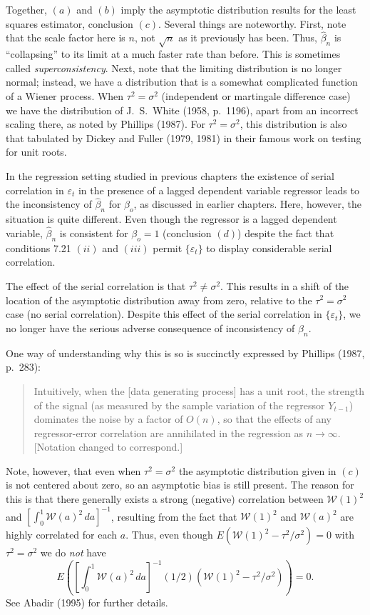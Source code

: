 Together, $(a)$ and $(b)$ imply the asymptotic distribution results for the least squares estimator, conclusion $(c)$. Several things are noteworthy. First, note that the scale factor here is $n$, not $\sqrt{n}$ as it previously has been. Thus, $\hat{\beta}_n$ is ``collapsing'' to its limit at a much faster rate than before. This is sometimes called \emph{superconsistency}. Next, note that the limiting distribution is no longer normal; instead, we have a distribution that is a somewhat complicated function of a Wiener process. When $\tau^2 = \sigma^2$ (independent or martingale difference case) we have the distribution of J.\ S.\ White (1958, p.\ 1196), apart from an incorrect scaling there, as noted by Phillips (1987). For $\tau^2 = \sigma^2$, this distribution is also that tabulated by Dickey and Fuller (1979, 1981) in their famous work on testing for unit roots.

In the regression setting studied in previous chapters the existence of serial correlation in $\varepsilon_t$ in the presence of a lagged dependent variable regressor leads to the inconsistency of $\hat{\beta}_n$ for $\beta_o$, as discussed in earlier chapters. Here, however, the situation is quite different. Even though the regressor is a lagged dependent variable, $\hat{\beta}_n$ is consistent for $\beta_o = 1$ (conclusion $(d)$) despite the fact that conditions 7.21 $(ii)$ and $(iii)$ permit $\{\varepsilon_t\}$ to display considerable serial correlation.

The effect of the serial correlation is that $\tau^2 \neq \sigma^2$. This results in a shift of the location of the asymptotic distribution away from zero, relative to the $\tau^2 = \sigma^2$ case (no serial correlation). Despite this effect of the serial correlation in $\{\varepsilon_t\}$, we no longer have the serious adverse consequence of inconsistency of $\hat{\beta}_n$.

One way of understanding why this is so is succinctly expressed by Phillips (1987, p.\ 283):

\begin{quote}
Intuitively, when the [data generating process] has a unit root, the strength of the signal (as measured by the sample variation of the regressor $Y_{t-1}$) dominates the noise by a factor of $O(n)$, so that the effects of any regressor-error correlation are annihilated in the regression as $n \to \infty$. [Notation changed to correspond.]
\end{quote}

Note, however, that even when $\tau^2 = \sigma^2$ the asymptotic distribution given in $(c)$ is not centered about zero, so an asymptotic bias is still present. The reason for this is that there generally exists a strong (negative) correlation between $\mathcal{W}(1)^2$ and $[\int_0^1 \mathcal{W}(a)^2\,da]^{-1}$, resulting from the fact that $\mathcal{W}(1)^2$ and $\mathcal{W}(a)^2$ are highly correlated for each $a$. Thus, even though $E(\mathcal{W}(1)^2 - \tau^2/\sigma^2) = 0$ with $\tau^2 = \sigma^2$ we do \emph{not} have
\[
E\left(\left[\int_0^1 \mathcal{W}(a)^2\,da\right]^{-1}(1/2)(\mathcal{W}(1)^2 - \tau^2/\sigma^2)\right) = 0.
\]
See Abadir (1995) for further details.

